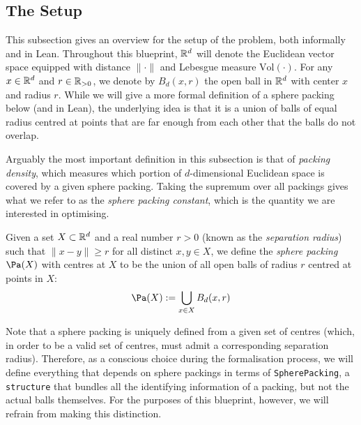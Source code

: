\subsection{The Setup}

This subsection gives an overview for the setup of the problem, both informally and in Lean. Throughout this blueprint, $\mathbb{R}^d$ will denote the Euclidean vector space equipped with distance $\|\cdot\|$ and Lebesgue measure $\mathrm{Vol}(\cdot)$. For any $x\in\mathbb{R}^d$ and $r\in\mathbb{R}_{>0}$, we denote by $B_d(x,r)$ the open ball in $\mathbb{R}^d$ with center $x$ and radius $r$. While we will give a more formal definition of a sphere packing below (and in Lean), the underlying idea is that it is a union of balls of equal radius centred at points that are far enough from each other that the balls do not overlap.

Arguably the most important definition in this subsection is that of \emph{packing density}, which measures which portion of $d$-dimensional Euclidean space is covered by a given sphere packing. Taking the supremum over all packings gives what we refer to as the \emph{sphere packing constant}, which is the quantity we are interested in optimising.

\begin{definition}\label{SpherePacking.balls}\leanok  %
  Given a set $X \subset \mathbb{R}^d$ and a real number $r > 0$ (known as the \emph{separation radius}) such that $\|x - y\| \geq r$ for all distinct $x, y \in X$, we define the \emph{sphere packing} $\Pa(X)$ with centres at $X$ to be the union of all open balls of radius $r$ centred at points in $X$:
  \[
    \Pa(X) := \bigcup_{x \in X} B_d(x, r)
  \]
\end{definition}

\begin{remark}\label{SpherePacking}\leanok
  Note that a sphere packing is uniquely defined from a given set of centres (which, in order to be a valid set of centres, must admit a corresponding separation radius). Therefore, as a conscious choice during the formalisation process, we will define everything that depends on sphere packings in terms of \verb|SpherePacking|, a \verb|structure| that bundles all the identifying information of a packing, but not the actual balls themselves. For the purposes of this blueprint, however, we will refrain from making this distinction.
\end{remark}

